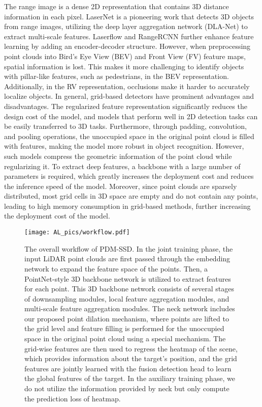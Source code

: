The range image is a dense 2D representation that contains 3D distance information in each pixel. LaserNet \cite{meyer2019lasernet} is a pioneering work that detects 3D objects from range images, utilizing the deep layer aggregation network (DLA-Net) \cite{yu2018deep} to extract multi-scale features. Laserflow \cite{meyer2020laserflow} and RangeRCNN \cite{liang2020rangercnn} further enhance feature learning by adding an encoder-decoder structure. However, when preprocessing point clouds into Bird's Eye View (BEV) and Front View (FV) feature maps, spatial information is lost. This makes it more challenging to identify objects with pillar-like features, such as pedestrians, in the BEV representation. Additionally, in the RV representation, occlusions make it harder to accurately localize objects. In general, grid-based detectors have prominent advantages and disadvantages. The regularized feature representation significantly reduces the design cost of the model, and models that perform well in 2D detection tasks can be easily transferred to 3D tasks. Furthermore, through padding, convolution, and pooling operations, the unoccupied space in the original point cloud is filled with features, making the model more robust in object recognition. However, such models compress the geometric information of the point cloud while regularizing it. To extract deep features, a backbone with a large number of parameters is required, which greatly increases the deployment cost and reduces the inference speed of the model. Moreover, since point clouds are sparsely distributed, most grid cells in 3D space are empty and do not contain any points, leading to high memory consumption in grid-based methods, further increasing the deployment cost of the model.

\begin{figure}[t]
	\begin{center}
		\texttt{[image: AL\_pics/workflow.pdf]}
	\end{center}
	\vspace{-0.3cm}
	\caption{The overall workflow of PDM-SSD. In the joint training phase, the input LiDAR point clouds are first passed through the embedding network to expand the feature space of the points. Then, a PointNet-style 3D backbone network is utilized to extract features for each point. This 3D backbone network consists of several stages of downsampling modules, local feature aggregation modules, and multi-scale feature aggregation modules. The neck network includes our proposed point dilation mechanism, where points are lifted to the grid level and feature filling is performed for the unoccupied space in the original point cloud using a special mechanism. The grid-wise features are then used to regress the heatmap of the scene, which provides information about the target's position, and the grid features are jointly learned with the fusion detection head to learn the global features of the target. In the auxiliary training phase, we do not utilize the information provided by neck but only compute the prediction loss of heatmap.}
	\label{fig2}
	\vspace{-0.3cm}
\end{figure}

